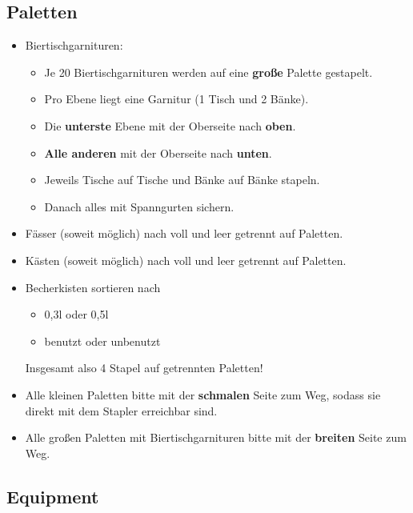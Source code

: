 \subsection{Paletten}
\begin{itemize}
  \item Biertischgarnituren:
    \begin{itemize}
      \item Je 20 Biertischgarnituren werden auf eine \textbf{große} Palette gestapelt.
      \item Pro Ebene liegt eine Garnitur (1 Tisch und 2 Bänke).
      \item Die \textbf{unterste} Ebene mit der Oberseite nach \textbf{oben}.
      \item \textbf{Alle anderen} mit der Oberseite nach \textbf{unten}.
      \item Jeweils Tische auf Tische und Bänke auf Bänke stapeln. %
      \item Danach alles mit Spanngurten sichern. %
    \end{itemize}
  \item Fässer (soweit möglich) nach voll und leer getrennt auf Paletten.
  \item Kästen (soweit möglich) nach voll und leer getrennt auf Paletten.
  \item Becherkisten sortieren nach
    \begin{itemize}
      \item 0,3l oder 0,5l
      \item benutzt oder unbenutzt
    \end{itemize}
    Insgesamt also 4 Stapel auf getrennten Paletten!
  \item Alle kleinen Paletten bitte mit der \textbf{schmalen} Seite zum Weg, sodass sie direkt mit dem Stapler erreichbar sind.
  \item Alle großen Paletten mit Biertischgarnituren bitte mit der \textbf{breiten} Seite zum Weg.
\end{itemize}
\subsection{Equipment}
